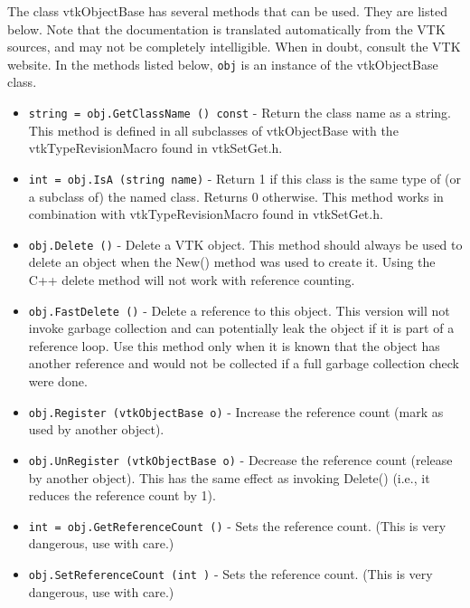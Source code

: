 The class vtkObjectBase has several methods that can be used.
  They are listed below.
Note that the documentation is translated automatically from the VTK sources,
and may not be completely intelligible.  When in doubt, consult the VTK website.
In the methods listed below, \verb|obj| is an instance of the vtkObjectBase class.
\begin{itemize}
\item  \verb|string = obj.GetClassName () const| -  Return the class name as a string. This method is defined
 in all subclasses of vtkObjectBase with the vtkTypeRevisionMacro found
 in vtkSetGet.h.

\item  \verb|int = obj.IsA (string name)| -  Return 1 if this class is the same type of (or a subclass of)
 the named class. Returns 0 otherwise. This method works in
 combination with vtkTypeRevisionMacro found in vtkSetGet.h.

\item  \verb|obj.Delete ()| -  Delete a VTK object.  This method should always be used to delete
 an object when the New() method was used to create it. Using the
 C++ delete method will not work with reference counting.

\item  \verb|obj.FastDelete ()| -  Delete a reference to this object.  This version will not invoke
 garbage collection and can potentially leak the object if it is
 part of a reference loop.  Use this method only when it is known
 that the object has another reference and would not be collected
 if a full garbage collection check were done.

\item  \verb|obj.Register (vtkObjectBase o)| -  Increase the reference count (mark as used by another object).

\item  \verb|obj.UnRegister (vtkObjectBase o)| -  Decrease the reference count (release by another object). This
 has the same effect as invoking Delete() (i.e., it reduces the
 reference count by 1).

\item  \verb|int = obj.GetReferenceCount ()| -  Sets the reference count. (This is very dangerous, use with care.)

\item  \verb|obj.SetReferenceCount (int )| -  Sets the reference count. (This is very dangerous, use with care.)

\end{itemize}
